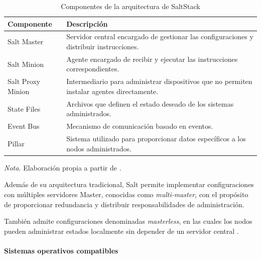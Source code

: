 \documentclass[12pt,a4paper]{article}
\begin{document}
\begin{table}[H]
    \centering
    \caption{Componentes de la arquitectura de SaltStack}
    \label{tab:arquitectura_salt}

    \begin{tabularx}{\textwidth}{p{}X}
        \toprule
        \textbf{Componente} & \textbf{Descripción} \\
        \midrule

        Salt Master &
        Servidor central encargado de gestionar las
        configuraciones y distribuir instrucciones. \\

        Salt Minion &
        Agente encargado de recibir y ejecutar las
        instrucciones correspondientes. \\

        Salt Proxy Minion &
        Intermediario para administrar dispositivos que
        no permiten instalar agentes directamente. \\

        State Files &
        Archivos que definen el estado deseado de los
        sistemas administrados. \\

        Event Bus &
        Mecanismo de comunicación basado en eventos. \\

        Pillar &
        Sistema utilizado para proporcionar datos específicos
        a los nodos administrados. \\

        \bottomrule
    \end{tabularx}

    \vspace{0.2cm}

    {\footnotesize
    \textit{Nota.} Elaboración propia a partir de
    \parencite{myers2015saltstack,salt_user_guide}.}
\end{table}

Además de su arquitectura tradicional, Salt permite implementar
configuraciones con múltiples servidores Master, conocidas como
\textit{multi-master}, con el propósito de proporcionar
redundancia y distribuir responsabilidades de administración.

También admite configuraciones denominadas \textit{masterless},
en las cuales los nodos pueden administrar estados localmente
sin depender de un servidor central
\parencite{salt_user_guide}.


\paragraph{Sistemas operativos compatibles}
\end{document}
